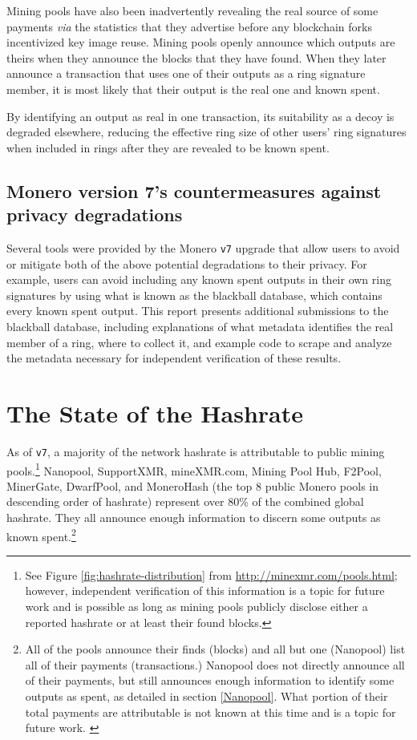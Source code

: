 \documentclass[notitlepage]{report}
\begin{document}
Mining pools have also been inadvertently revealing the real source of some payments \textit{via} the statistics that they advertise before any blockchain forks incentivized key image reuse.  Mining pools openly announce which outputs are theirs when they announce the blocks that they have found.  When they later announce a transaction that uses one of their outputs as a ring signature member, it is most likely that their output is the real one and known spent.

By identifying an output as real in one transaction, its suitability as a decoy is degraded elsewhere, reducing the effective ring size of other users' ring signatures when included in rings after they are revealed to be known spent.

\subsection{Monero version 7's countermeasures against privacy degradations} \label{effect}

Several tools were provided by the Monero \verb/v7/ upgrade that allow users to avoid or mitigate both of the above potential degradations to their privacy.  For example, users can avoid including any known spent outputs in their own ring signatures by using what is known as the blackball database, which contains every known spent output.  This report presents additional submissions to the blackball database, including explanations of what metadata identifies the real member of a ring, where to collect it, and example code to scrape and analyze the metadata necessary for independent verification of these results.

\section{The State of the Hashrate} \label{state-of-the-hashrate}
\setcounter{chapter}{2}

As of \verb/v7/, a majority of the network hashrate is attributable to public mining pools.\footnote{See Figure \ref{fig:hashrate-distribution} from \url{http://minexmr.com/pools.html}; however, independent verification of this information is a topic for future work and is possible as long as mining pools publicly disclose either a reported hashrate or at least their found blocks.}  Nanopool, SupportXMR, mineXMR.com, Mining Pool Hub, F2Pool, MinerGate, DwarfPool, and MoneroHash (the top 8 public Monero pools in descending order of hashrate) represent over 80\% of the combined global hashrate.  They all announce enough information to discern some outputs as known spent.\footnote{All of the pools announce their finds (blocks) and all but one (Nanopool) list all of their payments (transactions.)  Nanopool does not directly announce all of their payments, but still announces enough information to identify some outputs as spent, as detailed in section \ref{Nanopool}.  What portion of their total payments are attributable is not known at this time and is a topic for future work. \label{nanopool-surprisingly-not-the-worst}}
\end{document}
